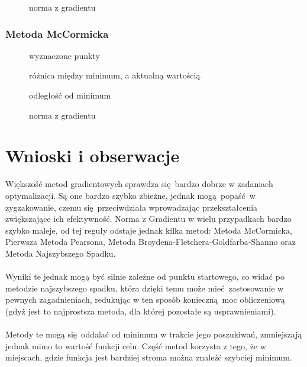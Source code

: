 \documentclass[a4paper, 10pt]{article}
\begin{document}
				\begin{figure}[H]
				  	\centering
				  	\def \svgwidth{0.75\columnwidth}
				  	
				  	\caption{norma z gradientu}
				\end{figure}\noindent		
			\subsubsection{Metoda McCormicka}
			    \begin{figure}[H]
			        \centering
			        \def \svgwidth{0.75\columnwidth}
			        
			        \caption{wyznaczone punkty}
			    \end{figure}\noindent
			
			
			    \begin{figure}[H]
			        \centering
			        \def \svgwidth{0.75\columnwidth}
			        
			        \caption{różnica między minimum, a aktualną wartością}
			    \end{figure}\noindent
			
			
			    \begin{figure}[H]
			        \centering
			        \def \svgwidth{0.75\columnwidth}
			        
			        \caption{odległość od minimum}
			    \end{figure}\noindent
				
			   \begin{figure}[H]
			    	\centering
			    	\def \svgwidth{0.75\columnwidth}
			    	
			    	\caption{norma z gradientu}
			   \end{figure}\noindent
	\section{Wnioski i obserwacje}
		Większość metod gradientowych sprawdza się bardzo dobrze w zadaniach optymalizacji. Są one bardzo szybko zbieżne, jednak mogą popaść w zygzakowanie, czemu się przeciwdziała wprowadzając przekształcenia zwiększające ich efektywność. Norma z Gradientu w wielu przypadkach bardzo szybko maleje, od tej reguły odstaje jednak kilka metod: Metoda McCormicka, Pierwsza Metoda Pearsona, Metoda Broydena-Fletchera-Goldfarba-Shanno oraz Metoda Najszybszego Spadku.
		\\
		\\
		Wyniki te jednak mogą być silnie zależne od punktu startowego, co widać po metodzie najszybszego spadku, która dzięki temu może mieć zastosowanie w pewnych zagadnieniach, redukując w ten sposób konieczną moc obliczeniową (gdyż jest to najprostsza metoda, dla której pozostałe są usprawnieniami).
		\\
		\\
		Metody te mogą się oddalać od minimum w trakcie jego poszukiwań, zmniejszają jednak mimo to wartość funkcji celu. Część metod korzysta z tego, że w miejscach, gdzie funkcja jest bardziej stroma można znaleźć szybciej minimum.
\end{document}
